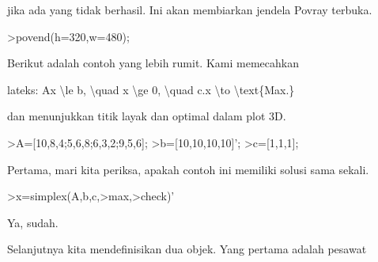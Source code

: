 \documentclass[a4paper,10pt]{article}
\begin{document}
\begin{eulernotebook}
\begin{eulercomment}
\begin{eulercomment}
\begin{eulercomment}
jika ada yang tidak berhasil. Ini akan membiarkan jendela Povray
terbuka.
\end{eulercomment}
\begin{eulerprompt}
>povend(h=320,w=480);
\end{eulerprompt}
\begin{eulercomment}
Berikut adalah contoh yang lebih rumit. Kami memecahkan

lateks: Ax \textbackslash{}le b, \textbackslash{}quad x \textbackslash{}ge 0, \textbackslash{}quad c.x \textbackslash{}to \textbackslash{}text\{Max.\}

dan menunjukkan titik layak dan optimal dalam plot 3D.
\end{eulercomment}
\begin{eulerprompt}
>A=[10,8,4;5,6,8;6,3,2;9,5,6];
>b=[10,10,10,10]';
>c=[1,1,1];
\end{eulerprompt}
\begin{eulercomment}
Pertama, mari kita periksa, apakah contoh ini memiliki solusi sama
sekali.
\end{eulercomment}
\begin{eulerprompt}
>x=simplex(A,b,c,>max,>check)'
\end{eulerprompt}
\begin{euleroutput}
  [0,  1,  0.5]
\end{euleroutput}
\begin{eulercomment}
Ya, sudah.

Selanjutnya kita mendefinisikan dua objek. Yang pertama adalah pesawat


\end{eulercomment}
\end{eulercomment}
\end{eulercomment}
\end{eulernotebook}
\end{document}
